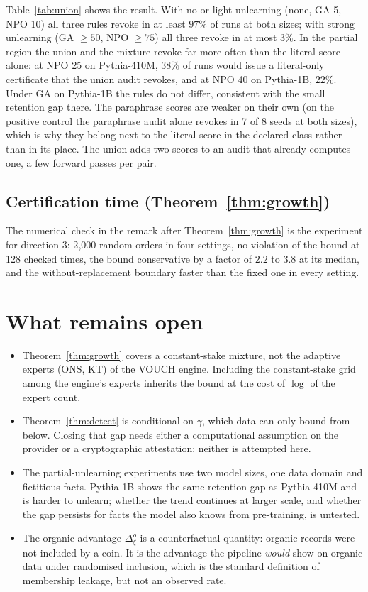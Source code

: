 \documentclass[11pt]{article}
\theoremstyle{definition}
\theoremstyle{remark}
\begin{document}
Table~\ref{tab:union} shows the result. With no or light unlearning (none, GA 5, NPO
10) all three rules revoke in at least $97\%$ of runs at both sizes; with strong
unlearning (GA $\ge 50$, NPO $\ge 75$) all three revoke in at most $3\%$. In the
partial region the union and the mixture revoke far more often than the literal score
alone: at NPO 25 on Pythia-410M, $38\%$ of runs would issue a literal-only
certificate that the union audit revokes, and at NPO 40 on Pythia-1B, $22\%$. Under
GA on Pythia-1B the rules do not differ, consistent with the small retention gap
there. The paraphrase scores are weaker on their own (on the positive control the
paraphrase audit alone revokes in 7 of 8 seeds at both sizes), which is why they belong next to the literal score in the declared class
rather than in its place. The union adds two scores to an audit that already computes
one, a few forward passes per pair.

\subsection{Certification time (Theorem~\ref{thm:growth})}

The numerical check in the remark after Theorem~\ref{thm:growth} is the experiment for
direction 3: 2{,}000 random orders in four settings, no violation of the bound at 128
checked times, the bound conservative by a factor of $2.2$ to $3.8$ at its median, and
the without-replacement boundary faster than the fixed one in every setting.

\section{What remains open}

\begin{itemize}
\item Theorem~\ref{thm:growth} covers a constant-stake mixture, not the adaptive
experts (ONS, KT) of the VOUCH engine. Including the constant-stake grid among the
engine's experts inherits the bound at the cost of $\log$ of the expert count.
\item Theorem~\ref{thm:detect} is conditional on $\gamma$, which data can only bound
from below. Closing that gap needs either a computational assumption on the
provider or a cryptographic attestation; neither is attempted here.
\item The partial-unlearning experiments use two model sizes, one data domain and
fictitious facts. Pythia-1B shows the same retention gap as Pythia-410M and is harder
to unlearn; whether the trend continues at larger scale, and whether the gap
persists for facts the model also knows from pre-training, is untested.
\item The organic advantage $\Delta^o_\xi$ is a counterfactual quantity: organic
records were not included by a coin. It is the advantage the pipeline \emph{would}
show on organic data under randomised inclusion, which is the standard definition
of membership leakage, but not an observed rate.
\end{itemize}
\end{document}
